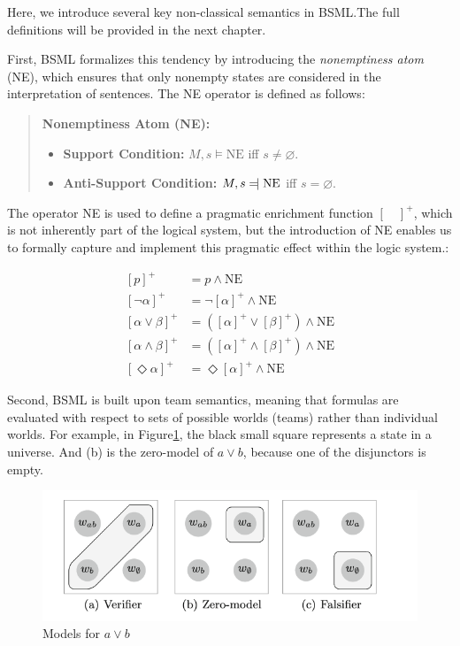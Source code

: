 Here, we introduce several key non-classical semantics in BSML.\@ The full definitions will be provided in the next chapter.\@


First, BSML formalizes this tendency by introducing the \textit{nonemptiness atom} (NE), which ensures that only nonempty states are considered in the interpretation of sentences. 
The NE operator is defined as follows:  

\begin{quote}
    \textbf{Nonemptiness Atom (NE):} 
    \begin{itemize}
        \item \textbf{Support Condition:} $M, s \models \text{NE}$ iff $s \neq \varnothing$.
        \item \textbf{Anti-Support Condition:} $M, s \leftmodels \text{NE}$ iff $s = \varnothing$.
    \end{itemize}
\end{quote}


    The operator NE is used to define a pragmatic enrichment function \({[ \quad]}^+\), which is not inherently part of the logical system, 
    but the introduction of NE enables us to formally capture and implement this pragmatic effect within the logic system.:


\begin{align*}
    {[p]}^+ &= p \land \text{NE} \\
    {[\neg \alpha]}^+ &= \neg {[\alpha]}^+ \land \text{NE} \\
    {[\alpha \lor \beta]}^+ &= ({[\alpha]}^+ \lor {[\beta]}^+) \land \text{NE} \\
    {[\alpha \land \beta]}^+ &= ({[\alpha]}^+ \land {[\beta]}^+) \land \text{NE} \\
    {[\Diamond \alpha]}^+ &= \Diamond {[\alpha]}^+ \land \text{NE}
\end{align*}

Second, BSML is built upon team semantics, meaning that formulas are evaluated with respect to sets of possible worlds (teams) rather than individual worlds. 
For example, in Figure\ref{disjunct}, the black small square represents a state in a universe.
And (b) is the zero-model of \( a \vee b \), because one of the disjunctors is empty.

\begin{figure}[h]
    \centering
    \includegraphics[width=\textwidth]{image/disj1.png}
    \caption{Models for \( a \vee b \)}\label{disjunct}
\end{figure}

